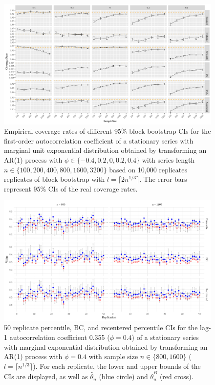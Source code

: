 \documentclass[10pt]{article}
\begin{document}
\begin{figure}[tbp]
  \centering
  \includegraphics[width=\textwidth]{figures/plot_exp_phi_2}
  \caption{Empirical coverage rates of different 95\% block bootstrap CIs for 
    the first-order autocorrelation coefficient of a stationary series
    with marginal unit exponential distribution obtained by transforming an AR(1) 
    process with 
    $\phi \in \{-0.4, 0.2, 0, 0.2, 0.4\}$ with series length
    $n \in \{100, 200, 400, 800, 1600, 3200\}$ based on 10,000 replicates 
    replicates of
    block bootstrap with $l = \lceil 2n^{1/3} \rceil$. 
    The error bars represent 95\% CIs of the real coverage rates.}
  \label{fig:exp_phi2}
\end{figure}

\begin{figure}[tbp]
  \centering
  \includegraphics[width=\textwidth]{figures/exp_phi_intervals}
  \caption{50 replicate percentile, BC, and recentered percentile CIs for the
    lag-1 autocorrelation coefficient 0.355 ($\phi = 0.4$)
    of a stationary series with marginal exponential distribution
    obtained by transforming an AR(1) process with $\phi = 0.4$ with
    sample size $n \in \{800, 1600\}$ ($l = \lceil n^{1/3} \rceil$). For 
    each replicate, the lower and upper bounds of the CIs are displayed, as well 
    as $\hat\theta_n$ (blue circle) and $\bar\theta_n^{B}$ (red cross).}
  \label{fig:eri}
\end{figure}
\end{document}
